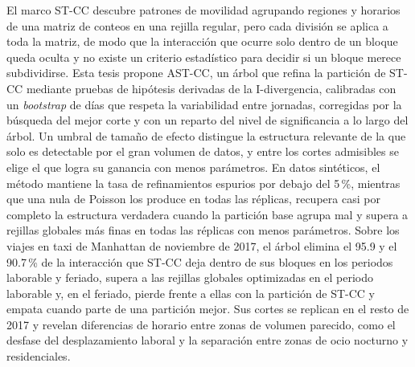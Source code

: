 \begin{resumen}
El marco ST-CC descubre patrones de movilidad agrupando regiones y horarios de una matriz de conteos en una rejilla regular, pero cada división se aplica a toda la matriz, de modo que la interacción que ocurre solo dentro de un bloque queda oculta y no existe un criterio estadístico para decidir si un bloque merece subdividirse. Esta tesis propone AST-CC, un árbol que refina la partición de ST-CC mediante pruebas de hipótesis derivadas de la I-divergencia, calibradas con un \emph{bootstrap} de días que respeta la variabilidad entre jornadas, corregidas por la búsqueda del mejor corte y con un reparto del nivel de significancia a lo largo del árbol. Un umbral de tamaño de efecto distingue la estructura relevante de la que solo es detectable por el gran volumen de datos, y entre los cortes admisibles se elige el que logra su ganancia con menos parámetros. En datos sintéticos, el método mantiene la tasa de refinamientos espurios por debajo del 5\,\%, mientras que una nula de Poisson los produce en todas las réplicas, recupera casi por completo la estructura verdadera cuando la partición base agrupa mal y supera a rejillas globales más finas en todas las réplicas con menos parámetros. Sobre los viajes en taxi de Manhattan de noviembre de 2017, el árbol elimina el 95.9 y el 90.7\,\% de la interacción que ST-CC deja dentro de sus bloques en los periodos laborable y feriado, supera a las rejillas globales optimizadas en el periodo laborable y, en el feriado, pierde frente a ellas con la partición de ST-CC y empata cuando parte de una partición mejor. Sus cortes se replican en el resto de 2017 y revelan diferencias de horario entre zonas de volumen parecido, como el desfase del desplazamiento laboral y la separación entre zonas de ocio nocturno y residenciales.
\end{resumen}
